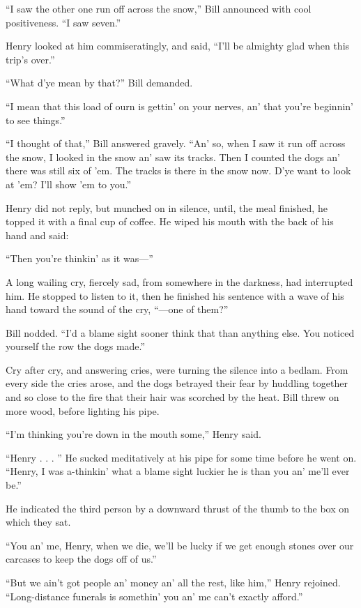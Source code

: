 “I saw the other one run off across the snow,” Bill announced with cool
positiveness. “I saw seven.”

Henry looked at him commiseratingly, and said, “I’ll be almighty glad
when this trip’s over.”

“What d’ye mean by that?” Bill demanded.

“I mean that this load of ourn is gettin’ on your nerves, an’ that
you’re beginnin’ to see things.”

“I thought of that,” Bill answered gravely. “An’ so, when I saw it run
off across the snow, I looked in the snow an’ saw its tracks. Then I
counted the dogs an’ there was still six of ’em. The tracks is there in
the snow now. D’ye want to look at ’em? I’ll show ’em to you.”

Henry did not reply, but munched on in silence, until, the meal
finished, he topped it with a final cup of coffee. He wiped his mouth
with the back of his hand and said:

“Then you’re thinkin’ as it was—”

A long wailing cry, fiercely sad, from somewhere in the darkness, had
interrupted him. He stopped to listen to it, then he finished his
sentence with a wave of his hand toward the sound of the cry, “—one of
them?”

Bill nodded. “I’d a blame sight sooner think that than anything else.
You noticed yourself the row the dogs made.”

Cry after cry, and answering cries, were turning the silence into a
bedlam. From every side the cries arose, and the dogs betrayed their
fear by huddling together and so close to the fire that their hair was
scorched by the heat. Bill threw on more wood, before lighting his
pipe.

“I’m thinking you’re down in the mouth some,” Henry said.

“Henry . . . ” He sucked meditatively at his pipe for some time before
he went on. “Henry, I was a-thinkin’ what a blame sight luckier he is
than you an’ me’ll ever be.”

He indicated the third person by a downward thrust of the thumb to the
box on which they sat.

“You an’ me, Henry, when we die, we’ll be lucky if we get enough stones
over our carcases to keep the dogs off of us.”

“But we ain’t got people an’ money an’ all the rest, like him,” Henry
rejoined. “Long-distance funerals is somethin’ you an’ me can’t exactly
afford.”

